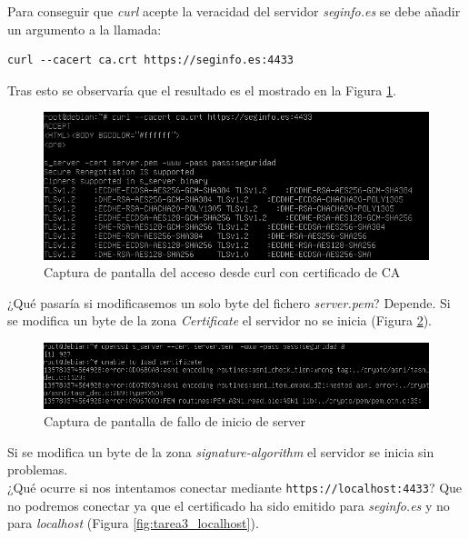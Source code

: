 \documentclass[10pt,a4paper]{article}
\begin{document}
Para conseguir que \emph{curl} acepte la veracidad del servidor \emph{seginfo.es} se debe añadir un argumento a la llamada:\\

\begin{lstlisting}
curl --cacert ca.crt https://seginfo.es:4433
\end{lstlisting}

Tras esto se observaría que el resultado es el mostrado en la Figura \ref{fig:tarea3_paso3}.

\begin{figure}[h!]
\centering
\includegraphics[scale=0.6]{images/tarea3_paso3.png}
\caption{Captura de pantalla del acceso desde curl con certificado de CA}
\label{fig:tarea3_paso3}
\end{figure}


¿Qué pasaría si modificasemos un solo byte del fichero \emph{server.pem}? Depende. Si se modifica un byte de la zona \emph{Certificate} el servidor no se inicia (Figura \ref{fig:tarea3_fallo_inicio_server}).\\

\begin{figure}[h!]
	\centering
	\includegraphics[scale=0.6]{images/tarea3_fallo_inicio_server.png}
	\caption{Captura de pantalla de fallo de inicio de server}
	\label{fig:tarea3_fallo_inicio_server}
\end{figure}
 Si se modifica un byte de la zona \emph{signature-algorithm} el servidor se inicia sin problemas.\\

¿Qué ocurre si nos intentamos conectar mediante \texttt{https://localhost:4433}? Que no podremos conectar ya que el certificado ha sido emitido para \emph{seginfo.es} y no para \emph{localhost} (Figura \ref{fig:tarea3_localhost}).\\
\end{document}
